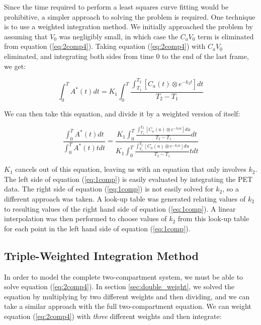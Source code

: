 \label{sec:double_weight}

Since the time required to perform a least squares curve fitting would
be prohibitive, a simpler approach to solving the problem is required.
One technique is to use a weighted integration method.  We initially
approached the problem by assuming that $V_{0}$ was negligibly small,
in which case the $C_{a}V_{0}$ term is eliminated from equation
(\ref{eq:2comp4}).  Taking equation (\ref{eq:2comp4}) with $C_{a}V_0$
eliminated, and integrating both sides from time 0 to the end of the
last frame, we get:

\begin{equation}
\int_{0}^{T} A^{*}(t) dt = K_{1} \int_{0}^{T} \frac{\int_{T_1}^{T_2}
\left[ C_{a}(t) \otimes e^{-k_{2}t} \right] dt}{T_2 - T_1}
\end{equation}

We can then take this equation, and divide it by a weighted version
of itself:

\begin{equation}
\frac{\int_{0}^{T} A^{*}(t) dt}{\int_{0}^{T} A^{*}(t) t dt} =
\frac{K_{1} \int_{0}^{T} \frac{\int_{T_1}^{T_2} \left[ C_{a}(u)
\otimes e^{-k_{2}u} \right] du}{T_2 - T_1} dt}{K_{1} \int_{0}^{T}
\frac{\int_{T_1}^{T_2} \left[ C_{a}(u) \otimes e^{-k_{2}u} \right]
du}{T_2 - T_1} t dt}
\label{eq:1comp}
\end{equation}

$K_{1}$ cancels out of this equation, leaving us with an equation
that only involves $k_{2}$.  The left side of equation
(\ref{eq:1comp}) is easily evaluated by integrating the PET data.
The right side of equation (\ref{eq:1comp}) is not easily solved for
$k_{2}$, so a different approach was taken.  A look-up table was
generated relating values of $k_{2}$ to resulting values of the
right hand side of equation (\ref{eq:1comp}).  A linear
interpolation was then performed to choose values of $k_{2}$ from
this look-up table for each point in the left hand side of equation
(\ref{eq:1comp}).


\subsection{Triple-Weighted Integration Method}

In order to model the complete two-compartment system, we must be able
to solve equation (\ref{eq:2comp4}).  In section
\ref{sec:double_weight},
we solved the equation by multiplying by two different weights and
then dividing, and we can take a similar approach with the full
two-compartment equation.  We can weight equation (\ref{eq:2comp4})
with {\em three} different weights and then integrate:

